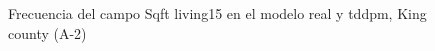 \begin{figure}[H]
    \centering
    
    \caption{Frecuencia del campo Sqft living15 en el modelo real y tddpm, King county (A-2)}
    \label{frecuency-tddpm-sqft living15}
\end{figure}